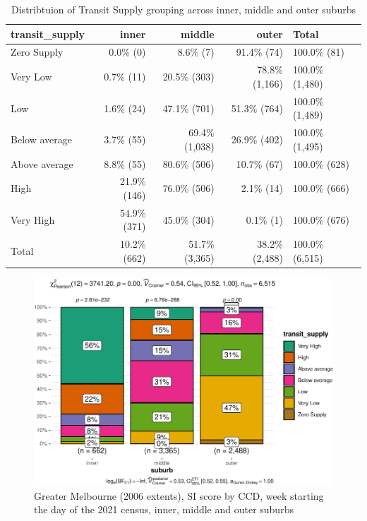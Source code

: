 \documentclass[preprint, 3p,
authoryear]{elsarticle} %
\begin{document}
\begin{table}

\caption{\label{tab:Greater_Melbourne_CCD_2021_by_suburbs}Distribtuion of Transit Supply grouping across inner, middle and outer suburbs}
\centering
\begin{tabular}[t]{l|r|r|r|l}
\hline
transit\_supply & inner & middle & outer & Total\\
\hline
Zero Supply & 0.0\%   (0) & 8.6\%     (7) & 91.4\%    (74) & 100.0\%    (81)\\
\hline
Very Low & 0.7\%  (11) & 20.5\%   (303) & 78.8\% (1,166) & 100.0\% (1,480)\\
\hline
Low & 1.6\%  (24) & 47.1\%   (701) & 51.3\%   (764) & 100.0\% (1,489)\\
\hline
Below average & 3.7\%  (55) & 69.4\% (1,038) & 26.9\%   (402) & 100.0\% (1,495)\\
\hline
Above average & 8.8\%  (55) & 80.6\%   (506) & 10.7\%    (67) & 100.0\%   (628)\\
\hline
High & 21.9\% (146) & 76.0\%   (506) & 2.1\%    (14) & 100.0\%   (666)\\
\hline
Very High & 54.9\% (371) & 45.0\%   (304) & 0.1\%     (1) & 100.0\%   (676)\\
\hline
Total & 10.2\% (662) & 51.7\% (3,365) & 38.2\% (2,488) & 100.0\% (6,515)\\
\hline
\end{tabular}
\end{table}

\begin{figure}
\includegraphics[width=1\linewidth]{Leveraging_GTFS_to_assess_transit_supply_Transport_Geography_files/figure-latex/Greater_Melbourne_CCD_2021_by_suburbs-1} \caption{Greater Melbourne (2006 extents), SI score by CCD, week starting the day of the 2021 census, inner, middle and outer suburbs}\label{fig:Greater_Melbourne_CCD_2021_by_suburbs}
\end{figure}
\end{document}
